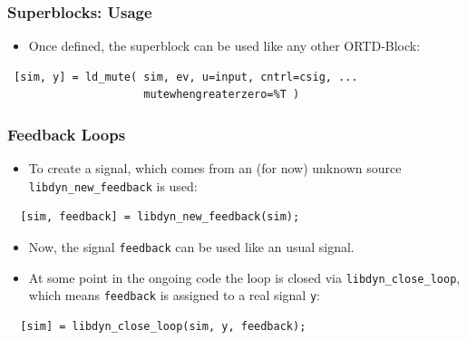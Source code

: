 \documentclass[serif,9pt,xcolor=dvipsnames]{beamer}
\begin{document}
\begin{frame}[fragile]
 \frametitle{Superblocks: Usage}
 
 \begin{itemize}
  \item Once defined, the superblock can be used like any other ORTD-Block:
 \end{itemize}

 
 {\small 
\begin{lstlisting} 
 [sim, y] = ld_mute( sim, ev, u=input, cntrl=csig, ...
                     mutewhengreaterzero=%T ) 
\end{lstlisting}}

\end{frame}




\begin{frame}[fragile]
 \frametitle{Feedback Loops}

  \begin{itemize}
   \item To create a signal, which comes from an (for now) unknown source \texttt{libdyn\_new\_feedback} is used:
  \end{itemize}


  {\small 
  \begin{lstlisting} 
  [sim, feedback] = libdyn_new_feedback(sim);
  \end{lstlisting}}

  \begin{itemize}
   \item Now, the signal \texttt{feedback} can be used like an usual signal.
   \item At some point in the ongoing code the loop is closed via \texttt{libdyn\_close\_loop}, which means \texttt{feedback} is assigned to a real signal \texttt{y}:
  \end{itemize}

  {\small 
  \begin{lstlisting} 
  [sim] = libdyn_close_loop(sim, y, feedback);
  \end{lstlisting}}
  
\end{frame}
\end{document}
